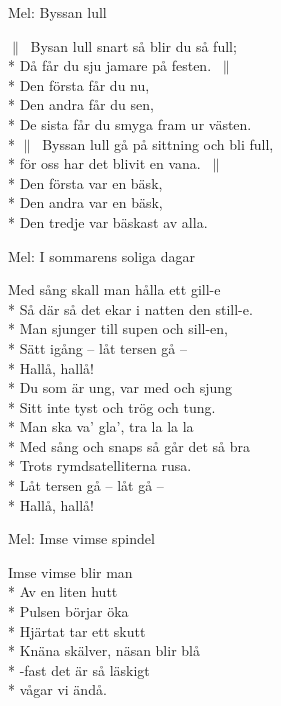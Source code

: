 \begin{SongText}
\begin{SongInfo}
    Mel: Byssan lull
\end{SongInfo}
\begin{SongVerse}
    $\|\:$ Bysan lull snart så blir du så full;\\*%
    Då får du sju jamare på festen. $\:\|$\\*%
    Den första får du nu,\\*%
    Den andra får du sen,\\*%
    De sista får du smyga fram ur västen.\\*%
    $\|\:$ Byssan lull gå på sittning och bli full,\\*%
    för oss har det blivit en vana. $\:\|$\\*%
    Den första var en bäsk,\\*%
    Den andra var en bäsk,\\*%
    Den tredje var bäskast av alla.
\end{SongVerse}
\end{SongText}
\begin{SongText}
\begin{SongInfo}
    Mel: I sommarens soliga dagar
\end{SongInfo}
\begin{SongVerse}
    Med sång skall man hålla ett gill-e\\*%
    Så där så det ekar i natten den still-e.\\*%
    Man sjunger till supen och sill-en,\\*%
    Sätt igång – låt tersen gå –\\*%
    Hallå, hallå!\\*%
    Du som är ung, var med och sjung\\*%
    Sitt inte tyst och trög och tung.\\*%
    Man ska va’ gla’, tra la la la\\*%
    Med sång och snaps så går det så bra\\*%
    Trots rymdsatelliterna rusa.\\*%
    Låt tersen gå – låt gå –\\*%
    Hallå, hallå!
\end{SongVerse}
\end{SongText}
\begin{SongText}
\begin{SongInfo}
    Mel: Imse vimse spindel
\end{SongInfo}
\begin{SongVerse}
    Imse vimse blir man\\*%
    Av en liten hutt\\*%
    Pulsen börjar öka\\*%
    Hjärtat tar ett skutt\\*%
    Knäna skälver, näsan blir blå\\*%
    -fast det är så läskigt\\*%
    vågar vi ändå.
\end{SongVerse}
\end{SongText}
